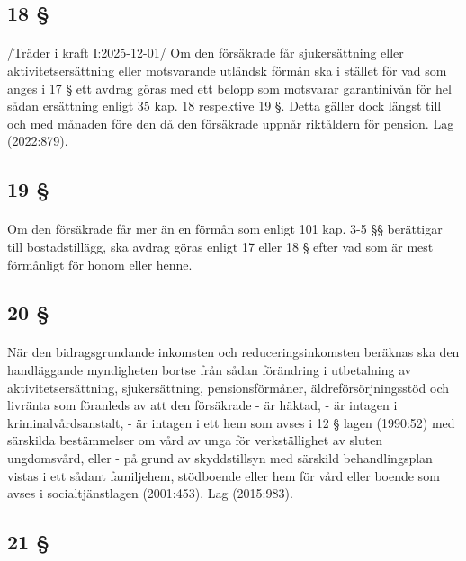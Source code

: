 \documentclass[a4paper,notitlepage,openany,10pt]{book}
\begin{document}
\subsection*{18 §}
\paragraph*{}
/Träder i kraft I:2025-12-01/
Om den försäkrade får sjukersättning eller aktivitetsersättning eller motsvarande utländsk förmån ska i stället för vad som anges i 17 § ett avdrag göras med ett belopp som motsvarar garantinivån för hel sådan ersättning enligt 35 kap. 18 respektive 19 §. Detta gäller dock längst till och med månaden före den då den försäkrade uppnår riktåldern för pension.
Lag (2022:879).
\subsection*{19 §}
\paragraph*{}
Om den försäkrade får mer än en förmån som enligt 101 kap. 3-5 §§ berättigar till bostadstillägg, ska avdrag göras enligt 17 eller 18 § efter vad som är mest förmånligt för honom eller henne.
\subsection*{20 §}
\paragraph*{}
När den bidragsgrundande inkomsten och reduceringsinkomsten beräknas ska den handläggande myndigheten bortse från sådan förändring i utbetalning av aktivitetsersättning, sjukersättning, pensionsförmåner, äldreförsörjningsstöd och livränta som föranleds av att den försäkrade
\newline - är häktad,
\newline - är intagen i kriminalvårdsanstalt,
\newline - är intagen i ett hem som avses i 12 § lagen (1990:52) med särskilda bestämmelser om vård av unga för verkställighet av sluten ungdomsvård, eller
\newline - på grund av skyddstillsyn med särskild behandlingsplan vistas i ett sådant familjehem, stödboende eller hem för vård eller boende som avses i socialtjänstlagen (2001:453).
Lag (2015:983).
\subsection*{21 §}
\end{document}
